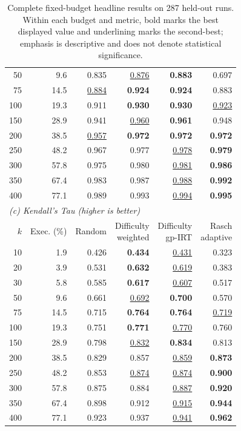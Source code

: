 \begin{table}[t]
\begin{tabular}{rrrrrr}
    50 & 9.6 & 0.835 & \underline{0.876} & \textbf{0.883} & 0.697 \\
    75 & 14.5 & \underline{0.884} & \textbf{0.924} & \textbf{0.924} & 0.883 \\
    100 & 19.3 & 0.911 & \textbf{0.930} & \textbf{0.930} & \underline{0.923} \\
    150 & 28.9 & 0.941 & \underline{0.960} & \textbf{0.961} & 0.948 \\
    200 & 38.5 & \underline{0.957} & \textbf{0.972} & \textbf{0.972} & \textbf{0.972} \\
    250 & 48.2 & 0.967 & 0.977 & \underline{0.978} & \textbf{0.979} \\
    300 & 57.8 & 0.975 & 0.980 & \underline{0.981} & \textbf{0.986} \\
    350 & 67.4 & 0.983 & 0.987 & \underline{0.988} & \textbf{0.992} \\
    400 & 77.1 & 0.989 & 0.993 & \underline{0.994} & \textbf{0.995} \\
    \midrule
    \multicolumn{6}{l}{\textit{(c) Kendall's Tau (higher is better)}} \\
    $k$ & Exec. (\%) & Random & \shortstack{Difficulty\\weighted} & \shortstack{Difficulty\\gp-IRT} & \shortstack{Rasch\\adaptive} \\
    \midrule
    10 & 1.9 & 0.426 & \textbf{0.434} & \underline{0.431} & 0.323 \\
    20 & 3.9 & 0.531 & \textbf{0.632} & \underline{0.619} & 0.383 \\
    30 & 5.8 & 0.585 & \textbf{0.617} & \underline{0.607} & 0.517 \\
    50 & 9.6 & 0.661 & \underline{0.692} & \textbf{0.700} & 0.570 \\
    75 & 14.5 & 0.715 & \textbf{0.764} & \textbf{0.764} & \underline{0.719} \\
    100 & 19.3 & 0.751 & \textbf{0.771} & \underline{0.770} & 0.760 \\
    150 & 28.9 & 0.798 & \underline{0.832} & \textbf{0.834} & 0.813 \\
    200 & 38.5 & 0.829 & 0.857 & \underline{0.859} & \textbf{0.873} \\
    250 & 48.2 & 0.853 & \underline{0.874} & \underline{0.874} & \textbf{0.900} \\
    300 & 57.8 & 0.875 & 0.884 & \underline{0.887} & \textbf{0.920} \\
    350 & 67.4 & 0.898 & 0.912 & \underline{0.915} & \textbf{0.944} \\
    400 & 77.1 & 0.923 & 0.937 & \underline{0.941} & \textbf{0.962} \\
    \bottomrule
  \end{tabular}
  \caption{Complete fixed-budget headline results on 287 held-out runs. Within each budget and metric, bold marks the best displayed value and underlining marks the second-best; emphasis is descriptive and does not denote statistical significance.}
  \label{tab:main-fixed-budget-complete}
\end{table}
